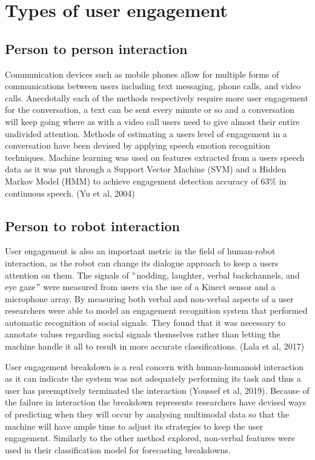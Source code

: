 \documentclass[12pt]{article}
\renewcommand{\_}{\kern-1.5pt\textunderscore\kern-1.5pt}
\begin{document}
\section*{Types of user engagement}
\subsection*{Person to person interaction}
Communication devices such as mobile phones allow for multiple forms of communications between users including text messaging, phone calls, and video calls. Anecdotally each of the methods respectively require more user engagement for the conversation, a text can be sent every minute or so and a conversation will keep going where as with a video call users need to give almost their entire undivided attention. Methods of estimating a users level of engagement in a conversation have been devised by applying speech emotion recognition techniques. Machine learning was used on features extracted from a users speech data as it was put through a Support Vector Machine (SVM) and a Hidden Markov Model (HMM) to achieve engagement detection accuracy of 63$\%$  in continuous speech. (Yu et al, 2004)\par


\vspace{\baselineskip}
\subsection*{Person to robot interaction}
User engagement is also an important metric in the field of human-robot interaction, as the robot can change its dialogue approach to keep a users attention on them. The signals of $``$nodding, laughter, verbal backchannels, and eye gaze$"$  were measured from users via the use of a Kinect sensor and a microphone array. By measuring both verbal and non-verbal aspects of a user researchers were able to model an engagement recognition system that performed automatic recognition of social signals. They found that it was necessary to annotate values regarding social signals themselves rather than letting the machine handle it all to result in more accurate classifications. (Lala et al, 2017)\par


\vspace{\baselineskip}
User engagement breakdown is a real concern with human-humanoid interaction as it can indicate the system was not adequately performing its task and thus a user has preemptively terminated the interaction (Youssef et al, 2019). Because of the failure in interaction the breakdown represents researchers have devised ways of predicting when they will occur by analysing multimodal data so that the machine will have ample time to adjust its strategies to keep the user engagement. Similarly to the other method explored, non-verbal features were used in their classification model for forecasting breakdowns.\par
\end{document}
